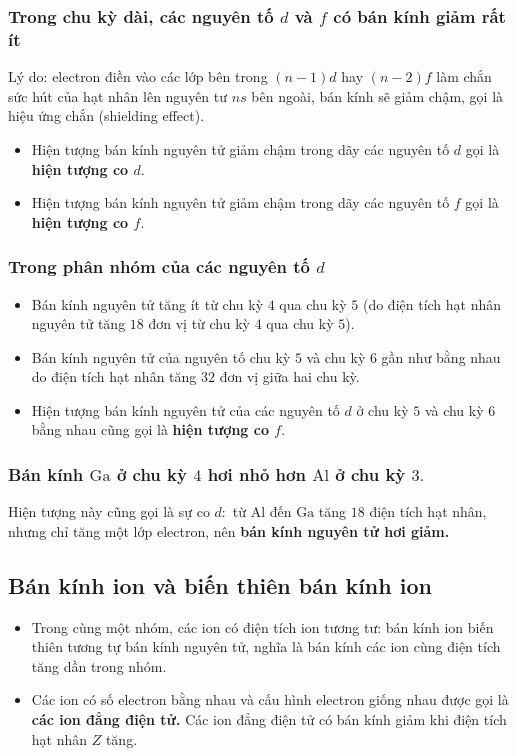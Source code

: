 \subsubsection{Trong chu kỳ dài, các nguyên tố $d$ và $f$ có bán kính giảm rất ít}
Lý do: electron điền vào các lớp bên trong $\left( {n - 1} \right)d$ hay $\left( {n - 2} \right)f$ làm chắn sức hút của hạt nhân lên nguyên tư $ns$ bên ngoài, bán kính sẽ giảm chậm, gọi là hiệu ứng chắn (shielding effect).
\begin{itemize}
\item Hiện tượng bán kính nguyên tử giảm chậm trong dãy các nguyên tố $d$ gọi là \textbf{hiện tượng co $d.$}
\item Hiện tượng bán kính nguyên tử giảm chậm trong dãy các nguyên tố $f$ gọi là \textbf{hiện tượng co $f.$}
\end{itemize}
\subsubsection{Trong phân nhóm của các nguyên tố $d$}
\begin{itemize}
\item Bán kính nguyên tử tăng ít từ chu kỳ $4$ qua chu kỳ $5$ (do điện tích hạt nhân nguyên tử tăng $18$ đơn vị từ chu kỳ $4$ qua chu kỳ $5$).
\item Bán kính nguyên tử của nguyên tố chu kỳ $5$ và chu kỳ $6$ gần như bằng nhau do điện tích hạt nhân tăng $32$ đơn vị giữa hai chu kỳ.
\item Hiện tượng bán kính nguyên tử của các nguyên tố $d$ ở chu kỳ $5$ và chu kỳ $6$ bằng nhau cũng gọi là \textbf{hiện tượng co $f.$}
\end{itemize}
\subsubsection{Bán kính $\mathrm{Ga}$ ở chu kỳ $4$ hơi nhỏ hơn $\mathrm{Al}$ ở chu kỳ $3.$}
Hiện tượng này cũng gọi là sự co $d:$ từ $\mathrm{Al}$ đến $\mathrm{Ga}$ tăng $18$ điện tích hạt nhân, nhưng chỉ tăng một lớp electron, nên \textbf{bán kính nguyên tử hơi giảm.}
\subsection{Bán kính ion và biến thiên bán kính ion}
\begin{itemize}
\item Trong cùng một nhóm, các ion có điện tích ion tương tư: bán kính ion biến thiên tương tự bán kính nguyên tử, nghĩa là bán kính các ion cùng điện tích tăng dần trong nhóm.
\item Các ion có số electron bằng nhau và cấu hình electron giống nhau được gọi là \textbf{các ion đẳng điện tử.} Các ion đẳng điện tử có bán kính giảm khi điện tích hạt nhân $Z$ tăng.
\end{itemize}

